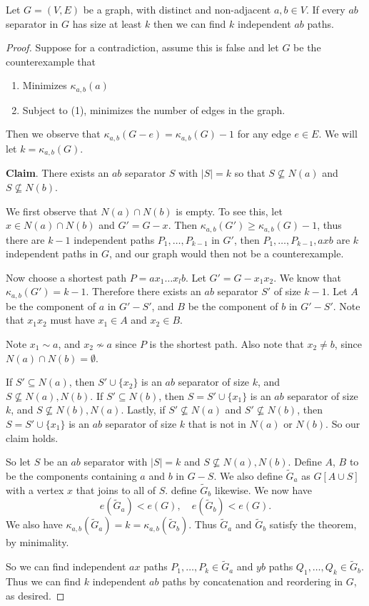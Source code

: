 \documentclass[a4paper]{scrartcl}
\begin{document}
\begin{theorem}
	Let $G = (V, E)$ be a graph, with distinct and non-adjacent $a, b \in V$. If every $ab$ separator in $G$ has size at least $k$ then we can find $k$ independent $ab$ paths.
\end{theorem}
\begin{proof}
	Suppose for a contradiction, assume this is false and let $G$ be the counterexample that 
	\begin{enumerate}[label=(\arabic*)]
		\item Minimizes $\kappa_{a, b}(a)$
		\item Subject to (1), minimizes the number of edges in the graph.
	\end{enumerate}
	Then we observe that $\kappa_{a, b}(G - e) = \kappa_{a, b}(G) - 1$ for any edge $e \in E$. We will let $k = \kappa_{a, b}(G)$.

	\textbf{Claim}. There exists an $ab$ separator $S$ with $|S| = k$ so that $S \not \subseteq N(a)$ and $S \not \subseteq N(b)$.

	We first observe that $N(a) \cap N(b)$ is empty. To see this, let $x \in N(a) \cap N(b)$ and $G' = G-x$. Then $\kappa_{a, b}(G') \geq \kappa_{a, b}(G) - 1$, thus there are $k - 1$ independent paths $P_1, \dots, P_{k - 1}$ in $G'$, then $P_1, \dots, P_{k - 1}, axb$ are $k$ independent paths in $G$, and our graph would then not be a counterexample.

	Now choose a shortest path $P = a x_1 \dots x_l b$. Let $G' = G - x_1 x_2$. We know that $\kappa_{a, b}(G') = k - 1$. Therefore there exists an $ab$ separator $S'$ of size $k - 1$.
	Let $A$ be the component of $a$ in $G' - S'$, and $B$ be the component of $b$ in $G' - S'$. Note that $x_1x_2$ must have $x_1 \in A$ and $x_2 \in B$. 

	Note $x_1 \sim a$, and $x_2 \not \sim a$ since $P$ is the shortest path. Also note that $x_2 \neq b$, since $N(a) \cap N(b) = \emptyset$. 

	If $S' \subseteq N(a)$, then $S' \cup \{x_2\}$ is an $ab$ separator of size $k$, and $S \not \subseteq N(a), N(b)$. If $S' \subseteq N(b)$, then $S = S' \cup \{x_1\}$ is an $ab$ separator of size $k$, and $S \not \subseteq N(b), N(a)$. Lastly, if $S' \not \subseteq N(a)$ and $S' \not \subseteq N(b)$, then $S = S' \cup \{x_1\}$ is an $ab$ separator of size $k$ that is not in $N(a)$ or $N(b)$. So our claim holds.

	So let $S$ be an $ab$ separator with $|S| = k$ and $S \not \subseteq N(a), N(b)$. Define $A$, $B$ to be the components containing $a$ and $b$ in $G - S$. We also define $\tilde{G}_a$ as $G[A\cup S]$ with a vertex $x$ that joins to all of $S$. define $\tilde{G}_b$ likewise. We now have
	$$
	e(\tilde{G}_a) < e(G), \quad e(\tilde{G}_b) < e(G).
	$$
	We also have $\kappa_{a, b}(\tilde{G}_a) = k = \kappa_{a, b}(\tilde{G}_b)$. Thus $\tilde{G}_a$ and $\tilde{G}_b$ satisfy the theorem, by minimality. 

	So we can find independent $ax$ paths $P_1, \dots, P_k \in \tilde{G}_a$ and $yb$ paths $Q_1, \dots, Q_k \in \tilde{G}_b$. Thus we can find $k$ independent $ab$ paths by concatenation and reordering in $G$, as desired.
\end{proof}
\end{document}
